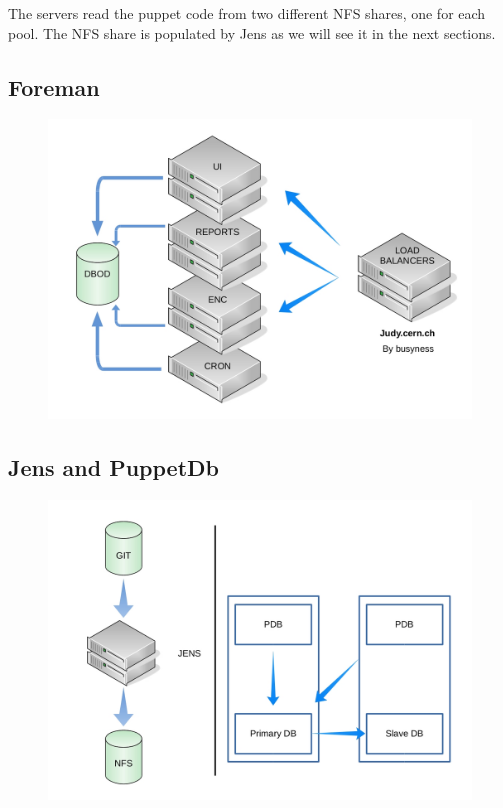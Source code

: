The servers read the puppet code from two different NFS shares, one for
each pool. The NFS share is populated by Jens as we will see it in the
next sections.

\subsection{Foreman}

\begin{figure}[H]
\includegraphics[width=\textwidth,height=\textheight,keepaspectratio]{ConfigurationManagement/Infrastructure_judy.jpg}
\end{figure}

\subsection{Jens and PuppetDb}

\begin{figure}[H]
\includegraphics[width=\textwidth,height=\textheight,keepaspectratio]{ConfigurationManagement/Infrastructure_jens_pdb.jpg}
\end{figure}
